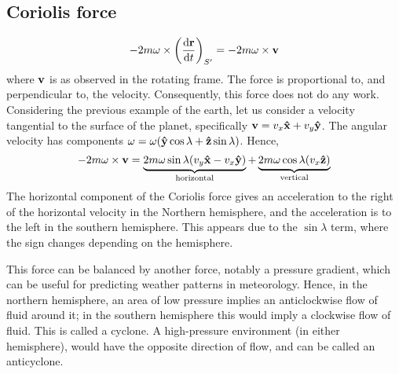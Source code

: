 \subsection{Coriolis force}
\[
	-2 m\vb\omega \times \left( \dv{\vb r}{t} \right)_{S'} = -2m\vb\omega \times \vb v
\]
where \(\vb v\) is as observed in the rotating frame.
The force is proportional to, and perpendicular to, the velocity.
Consequently, this force does not do any work.
Considering the previous example of the earth, let us consider a velocity tangential to the surface of the planet, specifically \(\vb v = v_x \vu x + v_y \vu y\).
The angular velocity has components \(\vb \omega = \omega(\vu y \cos\lambda + \vu z \sin\lambda)\).
Hence,
\[
	-2m\vb\omega \times \vb v = \underbrace{2m\omega\sin\lambda(v_y \vu x - v_x \vu y)}_{\text{horizontal}} + \underbrace{2m\omega\cos\lambda(v_x \vu z)}_{\text{vertical}}
\]
The horizontal component of the Coriolis force gives an acceleration to the right of the horizontal velocity in the Northern hemisphere, and the acceleration is to the left in the southern hemisphere.
This appears due to the \(\sin\lambda\) term, where the sign changes depending on the hemisphere.

This force can be balanced by another force, notably a pressure gradient, which can be useful for predicting weather patterns in meteorology.
Hence, in the northern hemisphere, an area of low pressure implies an anticlockwise flow of fluid around it; in the southern hemisphere this would imply a clockwise flow of fluid.
This is called a cyclone.
A high-pressure environment (in either hemisphere), would have the opposite direction of flow, and can be called an anticyclone.

